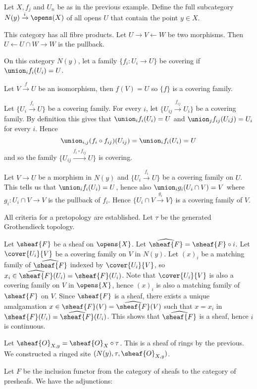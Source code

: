 Let $X,f_j$ and $U_n$ be as in the previous example.
Define the full subcategory $N(y)\xrightarrow{i}\opens(X)$ of all opens $U$ that contain the point $y\in X$.

This category has all fibre products. Let $U\rightarrow V \leftarrow W$ be two morphisms.
Then $U \leftarrow U\cap W \rightarrow W$ is the pullback.

On this category $N(y)$, let a family $\{f_i:U_i\rightarrow U\}$ be covering if $\union_i f_i(U_i) = U$. 

Let $V\xrightarrow{f} U$ be an isomorphism, then $f(V)=U$ so $\{f\}$ is a covering family.

Let $\{U_i \xrightarrow{f_i} U\}$ be a covering family. 
For every $i$, let $\{U_{ij}\xrightarrow{f_{ij}} U_i\}$ be a covering family. 
By definition this gives that $\union_i f_i(U_i)=U$ and $\union_j f_{ij}(U_ij)=U_i$ for every $i$. 
Hence \[\union_{i,j} (f_i \circ f_{ij}) (U_{ij}) = \union_{i} f_i(U_i)=U\] and so the family 
$\{U_{ij}\xrightarrow{f_i \circ f_{ij}} U\}$ is covering.

Let $V\rightarrow U$ be a morphism in $N(y)$ and $\{U_i \xrightarrow{f_i} U\}$ be a covering family on $U$.
This tells us that $\union_i f_i(U_i)=U$, hence also $\union_i g_i(U_i\cap V) = V$ where $g_i:U_i\cap V\rightarrow V$ is the pullback of $f_i$. 
Hence $\{U_i\cap V\xrightarrow{g_i}V\}$ is a covering family of $V$.

All criteria for a pretopology are established. Let $\tau$ be the generated Grothendieck topology.

Let $\sheaf{F}$ be a sheaf on $\opens{X}$.
Let $\widehat{\sheaf{F}} = \sheaf{F}\circ i$.
Let $\cover{U_i}{V}$ be a covering family on $V$ in $N(y)$.
Let $(x)_i$ be a matching family of $\widehat{\sheaf{F}}$ indexed by $\cover{U_i}{V}$, so $x_i \in \widehat{\sheaf{F}}(U_i) = \sheaf{F}(U_i)$.
Note that $\cover{U_i}{V}$ is also a covering family on $V$ in $\opens{X}$, hence $(x)_i$ is also a matching family of $\sheaf{F}$ on $V$.
Since $\sheaf{F}$ is a sheaf, there exists a unique amalgamation $x\in \sheaf{F}(V)=\widehat{\sheaf{F}}(V)$ such that $x=x_i$ in $\sheaf{F}(U_i)=\widehat{\sheaf{F}}(U_i)$. 
This shows that $\widehat{\sheaf{F}}$ is a sheaf, hence $i$ is continuous.

Let $\sheaf{O}_{X,y} = \sheaf{O}_X\circ \tau$. This is a sheaf of rings by the previous.
We constructed a ringed site $(N(y),\tau,\sheaf{O}_{X,y})$.

Let $F$ be the inclusion functor from the category of sheafs to the category of presheafs. 
We have the adjunctions:

